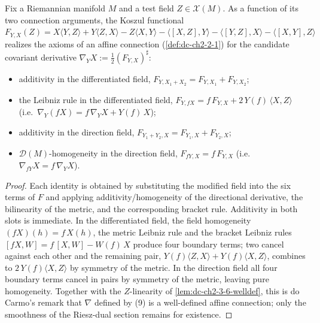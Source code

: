\begin{lemma}
  \label{lem:dc-ch2-3-6-affine}
  \leanok
  Fix a Riemannian manifold $M$ and a test field $Z \in \mathcal{X}(M)$. As a
  function of its two connection arguments, the Koszul functional
  $F_{Y,X}(Z) = X\langle Y,Z\rangle + Y\langle Z,X\rangle - Z\langle X,Y\rangle
    - \langle[X,Z],Y\rangle - \langle[Y,Z],X\rangle - \langle[X,Y],Z\rangle$
  realizes the axioms of an affine connection (\cref{def:dc-ch2-2-1}) for the
  candidate covariant derivative $\nabla_Y X := \tfrac12 (F_{Y,X})^\sharp$:
  \begin{itemize}
    \item additivity in the differentiated field,
      $F_{Y,X_1+X_2} = F_{Y,X_1} + F_{Y,X_2}$;
    \item the Leibniz rule in the differentiated field,
      $F_{Y,fX} = f\,F_{Y,X} + 2\,Y(f)\,\langle X,Z\rangle$
      (i.e.\ $\nabla_Y(fX) = f\,\nabla_Y X + Y(f)\,X$);
    \item additivity in the direction field,
      $F_{Y_1+Y_2,X} = F_{Y_1,X} + F_{Y_2,X}$;
    \item $\mathcal{D}(M)$-homogeneity in the direction field,
      $F_{fY,X} = f\,F_{Y,X}$ (i.e.\ $\nabla_{fY}X = f\,\nabla_Y X$).
  \end{itemize}
\end{lemma}
\begin{proof}
  \leanok
  Each identity is obtained by substituting the modified field into the six terms of
  $F$ and applying additivity/homogeneity of the directional derivative, the
  bilinearity of the metric, and the corresponding bracket rule. Additivity in both
  slots is immediate. In the differentiated field, the field homogeneity
  $(fX)(h) = f\,X(h)$, the metric Leibniz rule and the bracket Leibniz rules
  $[fX,W] = f\,[X,W] - W(f)\,X$ produce four boundary terms; two cancel against each
  other and the remaining pair, $Y(f)\langle Z,X\rangle + Y(f)\langle X,Z\rangle$,
  combines to $2\,Y(f)\langle X,Z\rangle$ by symmetry of the metric. In the direction
  field all four boundary terms cancel in pairs by symmetry of the metric, leaving
  pure homogeneity. Together with the $Z$-linearity of
  \cref{lem:dc-ch2-3-6-welldef}, this is do Carmo's remark that $\nabla$ defined by
  (9) is a well-defined affine connection; only the smoothness of the Riesz-dual
  section remains for existence.
\end{proof}

